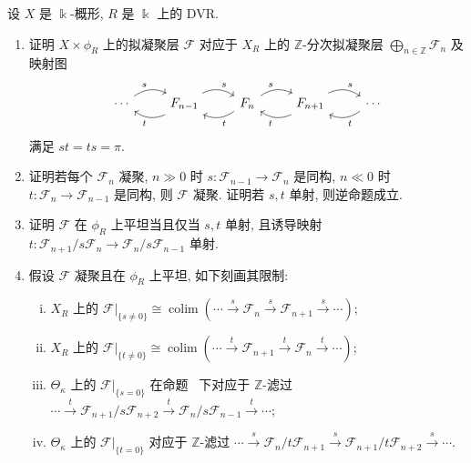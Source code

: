 \begin{exercise}\label{src:7.9.16}
设 $X$ 是 $\Bbbk$-概形, $R$ 是 $\Bbbk$ 上的 DVR.
\begin{enumerate}[(1)]
\item 证明 $X\times\phi_R$ 上的拟凝聚层 $\mathcal F$ 对应于 $X_R$ 上的 $\mathbb Z$-分次拟凝聚层 $\bigoplus_{n\in\mathbb Z}\mathcal F_n$ 及映射图
\[\begin{tikzcd}[ampersand replacement=\&]\cdots\arrow[r,bend left,"{s}"]\&\mathcal F_{n-1}\arrow[l,bend left,"{t}"]\arrow[r,bend left,"{s}"]\&\mathcal F_n\arrow[l,bend left,"{t}"]\arrow[r,bend left,"{s}"]\&\mathcal F_{n+1}\arrow[l,bend left,"{t}"]\arrow[r,bend left,"{s}"]\&\cdots\arrow[l,bend left,"{t}"]\end{tikzcd}\]
满足 $st=ts=\pi$.
\item 证明若每个 $\mathcal F_n$ 凝聚, $n\gg0$ 时 $s:\mathcal F_{n-1}\to\mathcal F_n$ 是同构, $n\ll0$ 时 $t:\mathcal F_n\to\mathcal F_{n-1}$ 是同构, 则 $\mathcal F$ 凝聚. 证明若 $s,t$ 单射, 则逆命题成立.
\item 证明 $\mathcal F$ 在 $\phi_R$ 上平坦当且仅当 $s,t$ 单射, 且诱导映射 $t:\mathcal F_{n+1}/s\mathcal F_n\to\mathcal F_n/s\mathcal F_{n-1}$ 单射.
\item 假设 $\mathcal F$ 凝聚且在 $\phi_R$ 上平坦, 如下刻画其限制:
\begin{enumerate}[(i)]
\item $X_R$ 上的 $\mathcal F|_{\{s\ne0\}}\cong\operatorname{colim}(\cdots\xrightarrow{s}\mathcal F_n\xrightarrow{s}\mathcal F_{n+1}\xrightarrow{s}\cdots)$;
\item $X_R$ 上的 $\mathcal F|_{\{t\ne0\}}\cong\operatorname{colim}(\cdots\xrightarrow{t}\mathcal F_{n+1}\xrightarrow{t}\mathcal F_n\xrightarrow{t}\cdots)$;
\item $\Theta_\kappa$ 上的 $\mathcal F|_{\{s=0\}}$ 在命题~ 下对应于 $\mathbb Z$-滤过 $\cdots\xrightarrow{t}\mathcal F_{n+1}/s\mathcal F_{n+2}\xrightarrow{t}\mathcal F_n/s\mathcal F_{n-1}\xrightarrow{t}\cdots$;
\item $\Theta_\kappa$ 上的 $\mathcal F|_{\{t=0\}}$ 对应于 $\mathbb Z$-滤过 $\cdots\xrightarrow{s}\mathcal F_n/t\mathcal F_{n+1}\xrightarrow{s}\mathcal F_{n+1}/t\mathcal F_{n+2}\xrightarrow{s}\cdots$.
\end{enumerate}
\end{enumerate}
\end{exercise}

